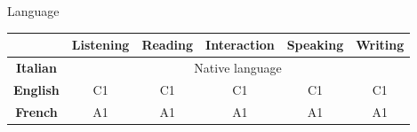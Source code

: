 \documentclass{resume} %
\begin{document}

\begin{rSection}{Language}
\begin{center}
\begin{tabular}{|c|c|c|c|c|c|}
	\hline
	&\textbf{Listening}&\textbf{Reading}&\textbf{Interaction}&\textbf{Speaking}&\textbf{Writing}\\\hline
	\textbf{Italian}&\multicolumn{5}{c}{Native language}\vline\\\hline
	\textbf{English}&C1&C1&C1&C1&C1\\\hline
	\textbf{French}&A1&A1&A1&A1&A1 \\
	\hline
\end{tabular}
\end{center}
\end{rSection}


\end{document}

